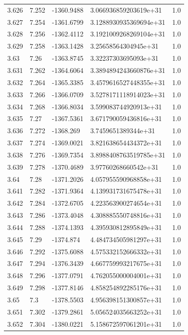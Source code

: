 \begin{tabular}{lllll}
3.626 & 7.252 & -1360.9488 & 3.066936859203619e+31 & 1.0 \\
3.627 & 7.254 & -1361.6799 & 3.1288930935369694e+31 & 1.0 \\
3.628 & 7.256 & -1362.4112 & 3.1921009268269104e+31 & 1.0 \\
3.629 & 7.258 & -1363.1428 & 3.25658564304945e+31 & 1.0 \\
3.63 & 7.26 & -1363.8745 & 3.32237303695093e+31 & 1.0 \\
3.631 & 7.262 & -1364.6064 & 3.3894894243660876e+31 & 1.0 \\
3.632 & 7.264 & -1365.3385 & 3.4579616527448355e+31 & 1.0 \\
3.633 & 7.266 & -1366.0709 & 3.5278171118914023e+31 & 1.0 \\
3.634 & 7.268 & -1366.8034 & 3.599083744920913e+31 & 1.0 \\
3.635 & 7.27 & -1367.5361 & 3.671790059436816e+31 & 1.0 \\
3.636 & 7.272 & -1368.269 & 3.7459651389344e+31 & 1.0 \\
3.637 & 7.274 & -1369.0021 & 3.821638654434372e+31 & 1.0 \\
3.638 & 7.276 & -1369.7354 & 3.8988408763519785e+31 & 1.0 \\
3.639 & 7.278 & -1370.4689 & 3.97760268660542e+31 & 1.0 \\
3.64 & 7.28 & -1371.2026 & 4.057955590968858e+31 & 1.0 \\
3.641 & 7.282 & -1371.9364 & 4.139931731675478e+31 & 1.0 \\
3.642 & 7.284 & -1372.6705 & 4.223563900274654e+31 & 1.0 \\
3.643 & 7.286 & -1373.4048 & 4.308885550748816e+31 & 1.0 \\
3.644 & 7.288 & -1374.1393 & 4.395930812895849e+31 & 1.0 \\
3.645 & 7.29 & -1374.874 & 4.484734505981297e+31 & 1.0 \\
3.646 & 7.292 & -1375.6088 & 4.575332152666332e+31 & 1.0 \\
3.647 & 7.294 & -1376.3439 & 4.667759993217675e+31 & 1.0 \\
3.648 & 7.296 & -1377.0791 & 4.762055000004001e+31 & 1.0 \\
3.649 & 7.298 & -1377.8146 & 4.858254892285176e+31 & 1.0 \\
3.65 & 7.3 & -1378.5503 & 4.956398151300857e+31 & 1.0 \\
3.651 & 7.302 & -1379.2861 & 5.056524035663252e+31 & 1.0 \\
3.652 & 7.304 & -1380.0221 & 5.158672597061201e+31 & 1.0 \\

\end{tabular}
